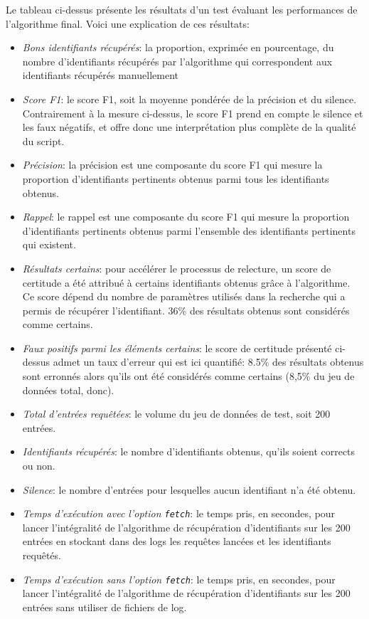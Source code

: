 Le tableau ci-dessus présente les résultats d'un test évaluant les performances de l'algorithme final. Voici une explication de ces résultats:
\begin{itemize}
	\item \textit{Bons identifiants récupérés}: la proportion, exprimée en pourcentage, du nombre d'identifiants récupérés par l'algorithme qui correspondent aux identifiants récupérés manuellement
	\item \textit{Score F1}: le \gls{score F1}, soit la moyenne pondérée de la précision et du silence. Contrairement  à la mesure ci-dessus, le score F1 prend en compte le silence et les faux négatifs, et offre donc une interprétation plus complète de la qualité du script.
	\item \textit{Précision}: la précision est une composante du \gls{score F1} qui mesure la proportion d'identifiants pertinents obtenus parmi tous les identifiants obtenus.
	\item \textit{Rappel}: le rappel est une composante du \gls{score F1} qui mesure la proportion d'identifiants pertinents obtenus parmi l'ensemble des identifiants pertinents qui existent.
	\item \textit{Résultats certains}: pour accélérer le processus de relecture, un score de certitude a été attribué à certains identifiants obtenus grâce à l'algorithme. Ce score dépend du nombre de paramètres utilisés dans la recherche qui a permis de récupérer l'identifiant. 36\% des résultats obtenus sont considérés comme certains.
	\item \textit{Faux positifs parmi les éléments certains}: le score de certitude présenté ci-dessus admet un taux d'erreur qui est ici quantifié: 8.5\% des résultats obtenus sont erronnés alors qu'ils ont été considérés comme certains (8,5\% du jeu de données total, donc).
	\item \textit{Total d'entrées requêtées}: le volume du jeu de données de test, soit 200 entrées.
	\item \textit{Identifiants récupérés}: le nombre d'identifiants obtenus, qu'ils soient corrects ou non.
	\item \textit{Silence}: le nombre d'entrées pour lesquelles aucun identifiant n'a été obtenu.
	\item \textit{Temps d'exécution avec l'option \texttt{fetch}}: le temps pris, en secondes, pour lancer l'intégralité de l'algorithme de récupération d'identifiants \wkd{} sur les 200 entrées en stockant dans des \glspl{log} les requêtes lancées et les identifiants requêtés.
	\item \textit{Temps d'exécution sans l'option \texttt{fetch}}: le temps pris, en secondes, pour lancer l'intégralité de l'algorithme de récupération d'identifiants sur les 200 entrées sans utiliser de fichiers de log.
\end{itemize}

